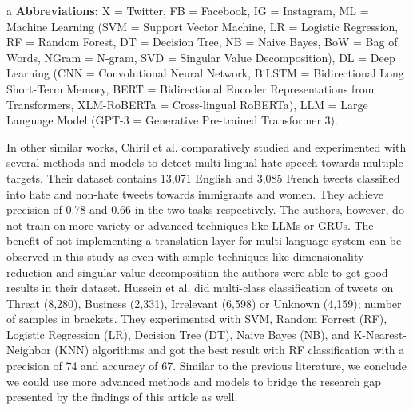 \begin{table*}[ht]
\begin{tablenotes}
\item[a] \textbf{Abbreviations:} X = Twitter, FB = Facebook, IG = Instagram, ML = Machine Learning (SVM = Support Vector Machine, LR = Logistic Regression, RF = Random Forest, DT = Decision Tree, NB = Naive Bayes, BoW = Bag of Words, NGram = N-gram, SVD = Singular Value Decomposition), DL = Deep Learning (CNN = Convolutional Neural Network, BiLSTM = Bidirectional Long Short-Term Memory, BERT = Bidirectional Encoder Representations from Transformers, XLM-RoBERTa = Cross-lingual RoBERTa), LLM = Large Language Model (GPT-3 = Generative Pre-trained Transformer 3).
\end{tablenotes}
\end{table*}

In other similar works, Chiril et al. \cite{french_hate_speech} comparatively studied and experimented with several methods and models to detect multi-lingual hate speech towards multiple targets. Their dataset contains 13,071 English and 3,085 French tweets classified into hate and non-hate tweets towards immigrants and women. They achieve precision of 0.78 and 0.66 in the two tasks respectively. The authors, however, do not train on more variety or advanced techniques like LLMs or GRUs. The benefit of not implementing a translation layer for multi-language system can be observed in this study as even with simple techniques like dimensionality reduction and singular value decomposition the authors were able to get good results in their dataset. Hussein et al. \cite{multiclass_classification} did multi-class classification of tweets on Threat (8,280), Business (2,331), Irrelevant (6,598) or Unknown (4,159); number of samples in brackets. They experimented with SVM, Random Forrest (RF), Logistic Regression (LR), Decision Tree (DT), Naive Bayes (NB), and K-Nearest-Neighbor (KNN) algorithms and got the best result with RF classification with a precision of 74 and accuracy of 67. Similar to the previous literature, we conclude we could use more advanced methods and models to bridge the research gap presented by the findings of this article as well. 


